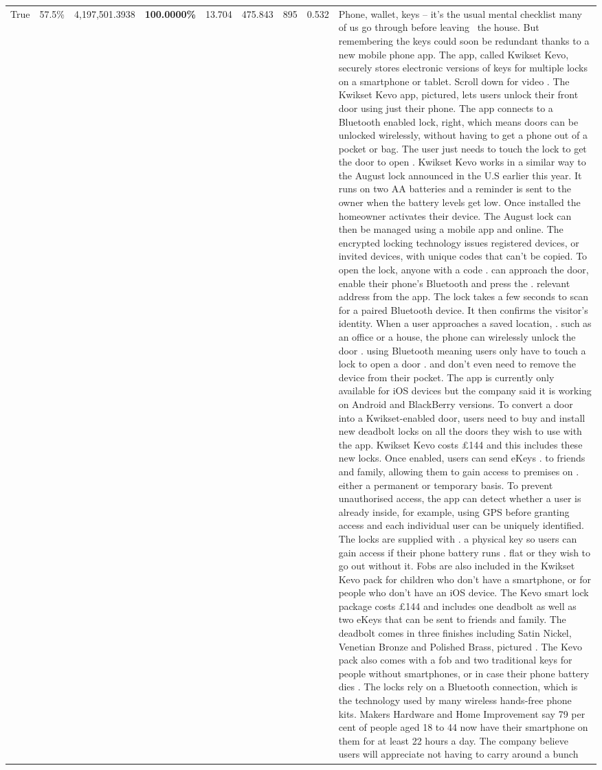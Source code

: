 \begin{table}[H]
\begin{tabular}{lllrlllll}
True & 57.5\% & 4,197,501.3938 & \bfseries \color{red} 100.0000\% & 13.704 & 475.843 & 895 & 0.532 & Phone, wallet, keys – it’s the usual mental checklist many of us go through before leaving  the house. But remembering the keys could soon be redundant thanks to a new mobile phone app. The app, called Kwikset Kevo, securely stores electronic versions of keys for multiple locks on a smartphone or tablet. Scroll down for video . The Kwikset Kevo app, pictured, lets users unlock their front door using just their phone. The app connects to a Bluetooth enabled lock, right, which means doors can be unlocked wirelessly, without having to get a phone out of a pocket or bag. The user just needs to touch the lock to get the door to open . Kwikset Kevo works in a similar way to the August lock announced in the U.S earlier this year. It runs on two AA batteries and a reminder is sent to the owner when the battery levels get low. Once installed the homeowner activates their device. The August lock can then be managed using a mobile app and online. The encrypted locking technology issues registered devices, or invited devices, with unique codes that can't be copied. To open the lock, anyone with a code . can approach the door, enable their phone's Bluetooth and press the . relevant address from the app. The lock takes a few seconds to scan for a paired Bluetooth device. It then confirms the visitor's identity. When a user approaches a saved location, . such as an office or a house, the phone can wirelessly unlock the door . using Bluetooth meaning users only have to touch a lock to open a door . and don't even need to remove the device from their pocket. The app is currently only available for iOS devices but the company said it is working on Android and BlackBerry versions. To convert a door into a Kwikset-enabled door, users need to buy and install new deadbolt locks on all the doors they wish to use with the app. Kwikset Kevo costs £144 and this includes these new locks. Once enabled, users can send eKeys . to friends and family, allowing them to gain access to premises on . either a permanent or temporary basis. To prevent unauthorised access, the app can detect whether a user is already inside, for example, using GPS before granting access and each individual user can be uniquely identified. The locks are supplied with . a physical key so users can gain access if their phone battery runs . flat or they wish to go out without it. Fobs are also included in the Kwikset Kevo pack for children who don't have a smartphone, or for people who don't have an iOS device. The Kevo smart lock package costs £144 and includes one deadbolt as well as two eKeys that can be sent to friends and family. The deadbolt comes in three finishes including Satin Nickel, Venetian Bronze and Polished Brass, pictured . The Kevo pack also comes with a fob and two traditional keys for people without smartphones, or in case their phone battery dies . The locks rely on a Bluetooth connection, which is the technology used by many wireless hands-free phone kits. Makers Hardware and Home Improvement say 79 per cent of people aged 18 to 44 now have their smartphone on them for at least 22 hours a day. The company believe users will appreciate not having to carry around a bunch 
\end{tabular}
\end{table}
